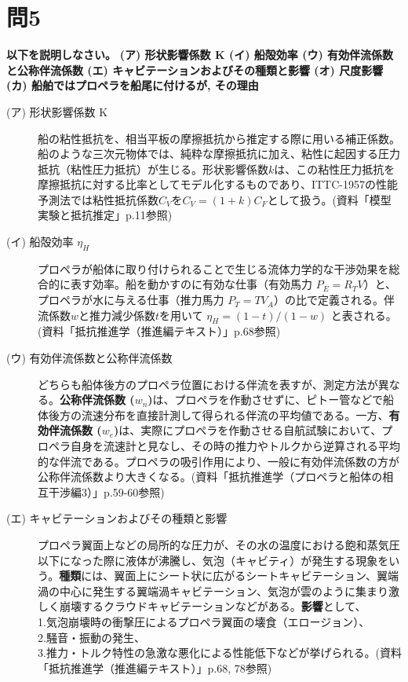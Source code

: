 \documentclass[12pt, a4paper, leqno, dvipdfmx]{jarticle}
\begin{document}
\newpage
\section*{問5}
\textbf{以下を説明しなさい。}
\textbf{(ア) 形状影響係数 K (イ) 船殻効率 (ウ) 有効伴流係数と公称伴流係数 (エ) キャビテーションおよびその種類と影響 (オ) 尺度影響 (カ) 船舶ではプロペラを船尾に付けるが, その理由}

\vspace{5mm}
\begin{description}
    \item[(ア) 形状影響係数 K]
    
    船の粘性抵抗を、相当平板の摩擦抵抗から推定する際に用いる補正係数。船のような三次元物体では、純粋な摩擦抵抗に加え、粘性に起因する圧力抵抗（粘性圧力抵抗）が生じる。形状影響係数$k$は、この粘性圧力抵抗を摩擦抵抗に対する比率としてモデル化するものであり、ITTC-1957の性能予測法では粘性抵抗係数$C_V$を$C_V=(1+k)C_F$として扱う。(資料「模型実験と抵抗推定」p.11参照)
    
    \item[(イ) 船殻効率 $\eta_H$] 
    
    プロペラが船体に取り付けられることで生じる流体力学的な干渉効果を総合的に表す効率。船を動かすのに有効な仕事（有効馬力 $P_E=R_T V$）と、プロペラが水に与える仕事（推力馬力 $P_T=T V_A$）の比で定義される。伴流係数$w$と推力減少係数$t$を用いて $\eta_H = (1-t)/(1-w)$ と表される。(資料「抵抗推進学（推進編テキスト）」p.68参照)
    
    \item[(ウ) 有効伴流係数と公称伴流係数] 
    
    どちらも船体後方のプロペラ位置における伴流を表すが、測定方法が異なる。\textbf{公称伴流係数 ($w_n$)}は、プロペラを作動させずに、ピトー管などで船体後方の流速分布を直接計測して得られる伴流の平均値である。一方、\textbf{有効伴流係数 ($w_e$)}は、実際にプロペラを作動させる自航試験において、プロペラ自身を流速計と見なし、その時の推力やトルクから逆算される平均的な伴流である。プロペラの吸引作用により、一般に有効伴流係数の方が公称伴流係数より大きくなる。(資料「抵抗推進学（プロペラと船体の相互干渉編3）」p.59-60参照)
    
    \item[(エ) キャビテーションおよびその種類と影響] 
    
    プロペラ翼面上などの局所的な圧力が、その水の温度における飽和蒸気圧以下になった際に液体が沸騰し、気泡（キャビティ）が発生する現象をいう。\textbf{種類}には、翼面上にシート状に広がるシートキャビテーション、翼端渦の中心に発生する翼端渦キャビテーション、気泡が雲のように集まり激しく崩壊するクラウドキャビテーションなどがある。\textbf{影響}として、
    \\1.気泡崩壊時の衝撃圧によるプロペラ翼面の壊食（エロージョン）、
    \\2.騒音・振動の発生、
    \\3.推力・トルク特性の急激な悪化による性能低下などが挙げられる。(資料「抵抗推進学（推進編テキスト）」p.68, 78参照)
    

\end{description}
\end{document}
